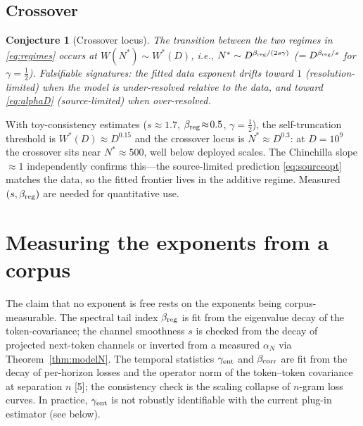 \documentclass[12pt]{article}
\newtheorem{conjecture}[theorem]{Conjecture}
\theoremstyle{remark}
\begin{document}
\subsection{Crossover}
\begin{conjecture}[Crossover locus]
\label{conj:crossover}
The transition between the two regimes in \eqref{eq:regimes} occurs at
$W(N^*)\sim W^*(D)$, i.e., $N^*\sim D^{\beta_{\rm reg}/(2s\gamma)}$
($=D^{\beta_{\rm reg}/s}$ for $\gamma=\frac12$). Falsifiable signatures: the
fitted data exponent drifts toward $1$ (resolution-limited) when the model is
under-resolved relative to the data, and toward \eqref{eq:alphaD}
(source-limited) when over-resolved.
\end{conjecture}

With toy-consistency estimates ($s\!\approx\!1.7$,
$\beta_{\rm reg}\!\approx\!0.5$, $\gamma\!=\!\tfrac12$), the self-truncation
threshold is $W^*(D)\!\approx\!D^{0.15}$ and the crossover locus is
$N^*\!\approx\!D^{0.3}$: at $D=10^9$ the crossover sits near $N^*\!\approx\!500$,
well below deployed scales.  The Chinchilla slope $\approx\!1$ independently
confirms this---the source-limited prediction \eqref{eq:sourceopt} matches the
data, so the fitted frontier lives in the additive regime.  Measured
$(s,\beta_{\rm reg})$ are needed for quantitative use.

\section{Measuring the exponents from a corpus}
\label{sec:measurement}

The claim that no exponent is free rests on the exponents being
corpus-measurable. The spectral tail index $\beta_{\rm reg}$ is fit from the
eigenvalue decay of the token-covariance; the channel smoothness $s$ is checked
from the decay of projected next-token channels or inverted from a measured
$\alpha_N$ via Theorem~\ref{thm:modelN}. The temporal statistics $\gamma_{\rm ent}$
and $\beta_{\rm corr}$ are fit from the decay of per-horizon losses and the
operator norm of the token--token covariance at separation $n$
[5]; the consistency check is the scaling collapse of
$n$-gram loss curves. In practice, $\gamma_{\rm ent}$ is not robustly
identifiable with the current plug-in estimator (see below).
\end{document}
